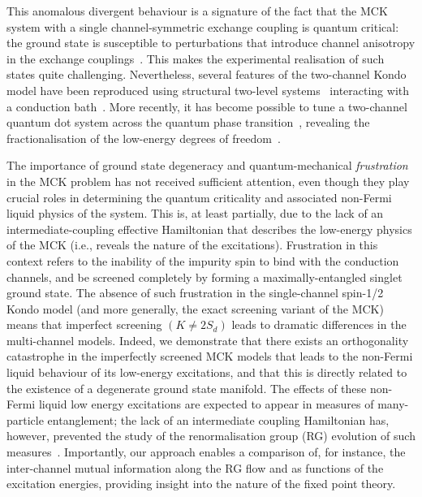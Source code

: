 \documentclass{iopart}
\begin{document}
This anomalous divergent behaviour is a signature of the fact that the MCK system with a single channel-symmetric exchange coupling is quantum critical: the ground state is susceptible to perturbations that introduce channel anisotropy in the exchange couplings~\cite{Noz_blandin_1980,andrei_jerez_1995,affleck_pang_cox_1992,zarand_2000,zheng_2021}. This makes the experimental realisation of such states quite challenging.
Nevertheless, several features of the two-channel Kondo model have been reproduced using structural two-level systems~\cite{zawadowski_1980,vladar_1983} interacting with a conduction bath~\cite{cichorek_2005,ralph_buhrman_1992,ralph_ludwig_1994,Iftikhar2015,Zhu2016}.
More recently, it has become possible to tune a two-channel quantum dot system across the quantum phase transition~\cite{Potok2007,Keller2015}, revealing the fractionalisation of the low-energy degrees of freedom~\cite{emery1995,Coleman_tsvelik,mebrahtu_2013}.

The importance of ground state degeneracy and quantum-mechanical \textit{frustration} in the MCK problem has not received sufficient attention, even though they play crucial roles in determining the quantum criticality and associated non-Fermi liquid physics of the system. This is, at least partially, due to the lack of an intermediate-coupling effective Hamiltonian that describes the low-energy physics of the MCK (i.e., reveals the nature of the excitations). Frustration in this context refers to the inability of the impurity spin to bind with the conduction channels, and be screened completely by forming a maximally-entangled singlet ground state. The absence of such frustration in the single-channel spin-1/2 Kondo model (and more generally, the exact screening variant of the MCK) means that imperfect screening \((K \neq 2S_d)\) leads to dramatic differences in the multi-channel models. Indeed, we demonstrate that there exists an orthogonality catastrophe in the imperfectly screened MCK models that leads to the non-Fermi liquid behaviour of its low-energy excitations, and that this is directly related to the existence of a degenerate ground state manifold. The effects of these non-Fermi liquid low energy excitations are expected to appear in measures of many-particle entanglement; the lack of an intermediate coupling Hamiltonian has, however, prevented the study of the renormalisation group (RG) evolution of such measures~\cite{alkurtass_affleck_2016,kim_shim_2021}. 
Importantly, our approach enables a comparison of, for instance, the inter-channel mutual information along the RG flow and as functions of the excitation energies, providing insight into the nature of the fixed point theory.
\end{document}
